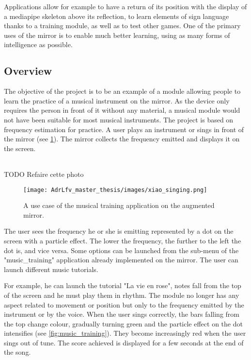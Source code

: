 Applications allow for example to have a return of its position with the display of a mediapipe skeleton above its reflection, to learn elements of sign language thanks to a training module, as well as to test other games. One of the primary uses of the mirror is to enable much better learning, using as many forms of intelligence as possible.

\subsection{Overview}

The objective of the project is to be an example of a module allowing people to learn the practice of a musical instrument on the mirror. As the device only requires the person in front of it without any material, a musical module would not have been suitable for most musical instruments.
The project is based on frequency estimation for practice. A user plays an instrument or sings in front of the mirror (see \ref{fig:xiao_singing}). The mirror collects the frequency emitted and displays it on the screen.

\\TODO Refaire cette photo

\begin{figure}[h]
    \centering
    \texttt{[image: AdrLfv\_master\_thesis/images/xiao\_singing.png]}
    \caption{A use case of the musical training application on the augmented mirror.}
    \label{fig:xiao_singing}
\end{figure}

The user sees the frequency he or she is emitting represented by a dot on the screen with a particle effect. The lower the frequency, the further to the left the dot is, and vice versa. Some options can be launched from the sub-menu of the "music\_training" application already
implemented on the mirror. The user can launch different music tutorials.

For example, he can launch the tutorial "La vie en rose", notes fall from the top of the screen and he must play them in rhythm. The module no longer has any aspect related to movement or position but only to the frequency emitted by the instrument or by the voice.
When the user sings correctly, the bars falling from the top change colour, gradually turning green and the particle effect on the dot intensifies (see \ref{fig:music_training}). They become increasingly red when the user sings out of tune. The score achieved is displayed for a few seconds at the end of the song.

